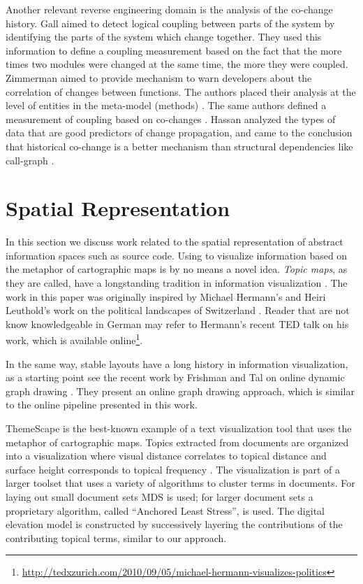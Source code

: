 Another relevant reverse engineering domain is the analysis of the co-change history.
%
Gall \etal aimed to detect logical coupling between parts of the system \cite{Gall98a} by identifying the parts of the system which change together. They used this information to define a coupling measurement based on the fact that the more times two modules were changed at the same time, the more they were coupled.
%
Zimmerman \etal aimed to provide mechanism to warn developers about the correlation of changes between functions. The authors placed their analysis at the level of entities in the meta-model (\eg methods) \cite{Zimm04a}. The same authors defined a measurement of coupling based on co-changes \cite{Zimm03a}.
%
Hassan \etal analyzed the  types of data that are good predictors of change propagation, and came to the conclusion that historical co-change is a better mechanism than structural dependencies like call-graph \cite{Hass04a}.

\section{Spatial Representation}

In this section we discuss work related to the spatial representation of abstract information spaces such as source code. Using \mds to visualize information based on the metaphor of cartographic maps is by no means a novel idea. \emph{Topic maps}, as they are called, have a longstanding tradition in information visualization \cite{Ware04a}. The work in this paper was originally inspired by Michael Hermann's and Heiri Leuthold's work on the political landscapes of Switzerland \cite{Herm03a}. Reader that are not know knowledgeable in German may refer to Hermann's recent TED talk on his work, which is available online\footnote{\url{http://tedxzurich.com/2010/09/05/michael-hermann-visualizes-politics}}.

In the same way, stable layouts have a long history in information visualization, as a starting point see \eg the recent work by Frishman and Tal on online dynamic graph drawing \cite{Fris08a}. They present an online graph drawing approach, which is similar to the online pipeline presented in this work.

ThemeScape is the best-known example of a text visualization tool that uses the metaphor of cartographic maps. 
Topics extracted from documents are organized into a visualization where visual distance correlates to topical distance and surface height corresponds to topical frequency \cite{Wise95b}. The visualization is part of a larger toolset that uses a variety of algorithms to cluster terms in documents. For laying out small document sets MDS is used; for larger document sets a proprietary algorithm, called ``Anchored Least Stress'', is used. The digital elevation model is constructed by successively layering the contributions of the contributing topical terms, similar to our approach.

